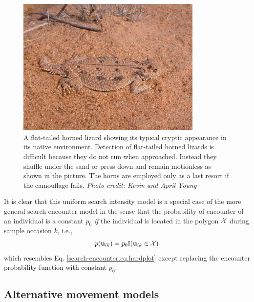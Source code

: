 \begin{figure}
\centering
\includegraphics[width=3.6in,height=2.7in]{Ch15-searchencounter/figs/horny_lizard.jpg}
\caption{A flat-tailed horned lizard showing its typical cryptic
  appearance in its native environment.  Detection of flat-tailed
  horned lizards is difficult because they do not run when
  approached. Instead they shuffle under the sand or press down and
  remain motionless as shown in the picture.  The horns are employed
  only as a last resort if the camouflage fails.  {\it Photo credit:
    Kevin and April Young} }
\label{searchencounter.fig.hornylizard}
\end{figure}

It is clear that this uniform search intensity model is a special case
of the more general search-encounter model in the sense that the
probability of encounter of an individual is a constant $p_{0}$ {\it
  if} the individual is located in the polygon ${\cal X}$ during
sample occasion $k$, i.e.,
\[
p({\bf u}_{ik}) = p_{0} \mbox{I}({\bf u}_{ik} \in {\cal X})
\]
which resembles Eq. \ref{search-encounter.eq.hardplot} except
replacing the encounter probability function with constant $p_{0}$.


\subsection{Alternative movement models}
\label{searchencounter.sec.movement}

